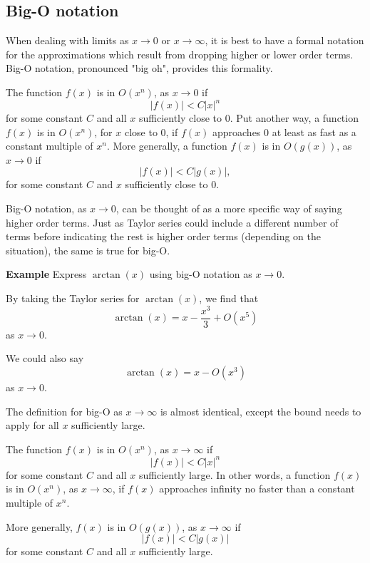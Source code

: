 \documentclass[twoside,openright,titlepage,a4paper]{book}
\begin{document}
\begin{sloppypar}
\subsection{Big-O notation}

When dealing with limits as $x \rightarrow 0$ or $x \rightarrow \infty$, it is best to have a formal notation for the approximations which result from dropping higher or lower order terms. Big-O notation, pronounced "big oh", provides this formality.

\begin{definitionbox}[title=\textbf{Big-O notation, $x \rightarrow 0$}]
The function $f(x)$ is in $O(x^n)$, as $x \rightarrow 0$ if \[ |f(x)| < C|x|^n \] for some constant $C$ and all $x$ sufficiently close to 0. Put another way, a function $f(x)$ is in $O(x^n)$, for $x$ close to 0, if $f(x)$ approaches 0 at least as fast as a constant multiple of $x^n$.
More generally, a function $f(x)$ is in $O(g(x))$, as $x \rightarrow 0$ if \[ |f(x)| < C|g(x)|, \] for some constant $C$ and $x$ sufficiently close to 0.
\end{definitionbox}

Big-O notation, as $x \rightarrow 0$, can be thought of as a more specific way of saying higher order terms. Just as Taylor series could include a different number of terms before indicating the rest is higher order terms (depending on the situation), the same is true for big-O.

\textbf{Example} Express $\arctan(x)$ using big-O notation as $x \rightarrow 0$. 
\begin{examplebox}
By taking the Taylor series for $\arctan(x)$, we find that \[ \arctan(x)= x - \frac{x^3}{3} + O(x^5) \] as $x \rightarrow 0$.

We could also say \[ \arctan(x)= x - O(x^3) \] as $x \rightarrow 0$.
\end{examplebox}

The definition for big-O as $x \rightarrow \infty$ is almost identical, except the bound needs to apply for all $x$ sufficiently large.

\begin{definitionbox}[title=\textbf{Big-O notation, $x \rightarrow \infty$}]
The function $f(x)$ is in $O(x^n)$, as $x \rightarrow \infty$ if \[ |f(x)| < C|x|^n \] for some constant $C$ and all $x$ sufficiently large. In other words, a function $f(x)$ is in $O(x^n)$, as $x \rightarrow \infty$, if $f(x)$ approaches infinity no faster than a constant multiple of $x^n$.

More generally, $f(x)$ is in $O(g(x))$, as $x \rightarrow \infty$ if \[ |f(x)| < C |g(x)| \] for some constant $C$ and all $x$ sufficiently large.
\end{definitionbox}


\end{sloppypar}
\end{document}
